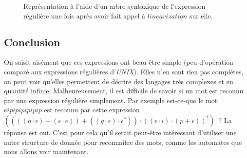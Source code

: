 \documentclass[12pt]{article}
\begin{document}
\begin{figure}[H]
    \centering
    \caption{
        Représentation à l'aide d'un arbre syntaxique de l'expression régulière
        une fois après avoir fait appel à \(linearization\) sur elle.
    }
\end{figure}

\subsection{Conclusion}

On saisit aisément que ces expressions ont beau être simple (peu d'opération
comparé aux expressions régulières d'\textit{UNIX}). Elles n'en sont rien pas
complètes, on peut voir qu'elles permettent de décrire des langages très
complexes et en quantité infinie. Malheureusement, il est difficile de savoir
si un mot est reconnu par une expression régulière simplement. Par exemple
est-ce-que le mot \(eipipipipipip\) est reconnu par cette expression \(((((o
\cdot \epsilon)+(\epsilon \cdot e))+((g\cdot \epsilon) \cdot \epsilon^*)) \cdot
((\epsilon \cdot i)\cdot (p+\epsilon))^*)\)~? La réponse est oui. C'est pour
cela qu'il serait peut-être intéressant d'utiliser une autre structure de
donnée pour reconnaitre des mots, comme les automates que nous allons voir
maintenant.
\end{document}
